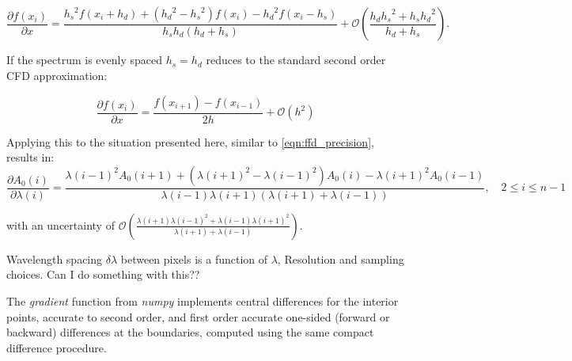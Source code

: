 \[\frac{\partial{f(x_i)}}{\partial{x}} = \frac{{h_{s}}^{2}f\left(x_{i} + {h_{d}}\right) + \left({h_{d}}^{2} - {h_{s}}^{2}\right)f\left(x_{i}\right) - {h_{d}}^{2}f\left(x_{i}-{h_{s}}\right)} {{h_{s}}{h_{d}}\left({h_{d}} + {h_{s}}\right)} + \mathcal{O}\left(\frac{h_{d}{h_{s}}^{2} + {h_{s}}{h_{d}}^{2}}{{h_{d}} + {h_{s}}}\right) \label{full_compact_difference}.\]

If the spectrum is evenly spaced ${h_{s}}={h_{d}}$  reduces to the standard second order {CFD} approximation:

\[\frac{\partial{f(x_i)}}{\partial{x}} = \frac{f\left(x_{i+1}\right) - f\left(x_{i-1}\right)}{2h} + \mathcal{O}\left({h}^{2}\right)\]


Applying this to the situation presented here, similar to \cref{eqn:ffd_precision}, results in:
\[\frac{\partial A_0(i)}{\partial\lambda(i)} = \frac{{\lambda(i-1)}^{2} A_0(i+1) + ({\lambda(i+1)}^{2}-{\lambda(i-1)}^{2}) A_0(i) - {\lambda(i+1)}^{2} A_0(i-1)} {\lambda(i-1)\lambda(i+1)(\lambda(i+1) + \lambda(i-1))}, \hspace{1em} 2 \leq i \leq n-1\]

with an uncertainty of \(\mathcal{O}\left(\frac{\lambda(i+1){\lambda(i-1)}^{2} + \lambda(i-1){\lambda(i+1)}^{2}}{\lambda(i+1) + \lambda(i-1)}\right)\).


{\red{} Wavelength spacing \(\delta\lambda\) between pixels is a function of \(\lambda\), Resolution and sampling choices.
Can I do something with this??}

The \emph{gradient} function from \emph{numpy} implements central differences for the interior points, accurate to second order, and first order accurate one-sided (forward or backward) differences at the boundaries, computed using the same compact difference procedure.

